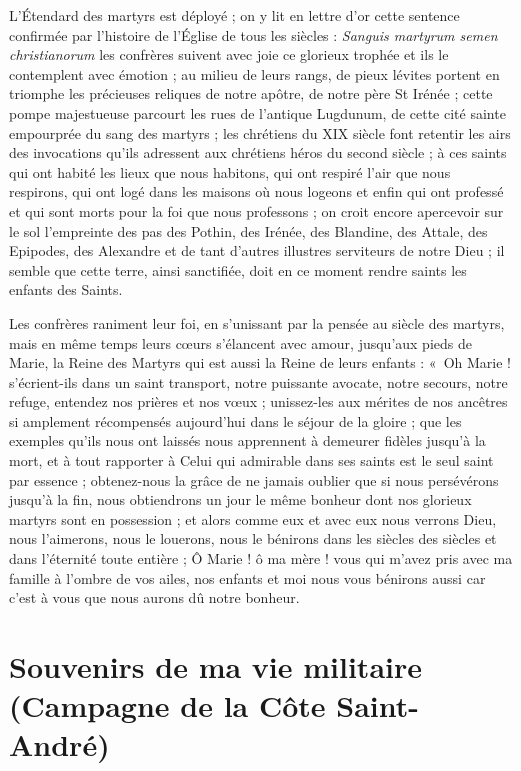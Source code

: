 \documentclass[11pt,a4paper]{report}
\begin{document}
L'Étendard des martyrs est déployé ; on y lit en lettre d'or cette sentence confirmée par l'histoire de l'Église de tous les siècles : \textit{Sanguis martyrum semen christianorum} les confrères suivent avec joie ce glorieux trophée et ils le contemplent avec émotion ; au milieu de leurs rangs, de pieux lévites portent en triomphe les précieuses reliques de notre apôtre, de notre père St Irénée ; cette pompe majestueuse parcourt les rues de l'antique Lugdunum, de cette cité sainte empourprée du sang des martyrs ; les chrétiens du XIX siècle font retentir les airs des invocations qu'ils adressent aux chrétiens héros du second siècle ; à ces saints qui ont habité les lieux que nous habitons, qui ont respiré l'air que nous respirons, qui ont logé dans les maisons où nous logeons et enfin qui ont professé et qui sont morts pour la foi que nous professons ; on croit encore apercevoir sur le sol l'empreinte des pas des Pothin, des Irénée, des Blandine, des Attale, des Epipodes, des Alexandre et de tant d'autres illustres serviteurs de notre Dieu ; il semble que cette terre, ainsi sanctifiée, doit en ce moment rendre saints les enfants des Saints.

Les confrères raniment leur foi, en s'unissant par la pensée au siècle des martyrs, mais en même temps leurs cœurs s'élancent avec amour, jusqu'aux pieds de Marie, la Reine des Martyrs qui est aussi la Reine de leurs enfants : «~Oh Marie ! s'écrient-ils dans un saint transport, notre puissante avocate, notre secours, notre refuge, entendez nos prières et nos vœux ; unissez-les aux mérites de nos ancêtres si amplement récompensés aujourd'hui dans le séjour de la gloire ; que les exemples qu'ils nous ont laissés nous apprennent à demeurer fidèles jusqu'à la mort, et à tout rapporter à Celui qui admirable dans ses saints est le seul saint par essence ; obtenez-nous la grâce de ne jamais oublier que si nous persévérons jusqu'à la fin, nous obtiendrons un jour le même bonheur dont nos glorieux martyrs sont en possession ; et alors comme eux et avec eux nous verrons Dieu, nous l'aimerons, nous le louerons, nous le bénirons dans les siècles des siècles et dans l'éternité toute entière ; Ô Marie ! ô ma mère ! vous qui m'avez pris avec ma famille à l'ombre de vos ailes, nos enfants et moi nous vous bénirons aussi car c'est à vous que nous aurons dû notre bonheur.~


\chapter{Souvenirs de ma vie militaire (Campagne de la Côte Saint-André)}
\end{document}
